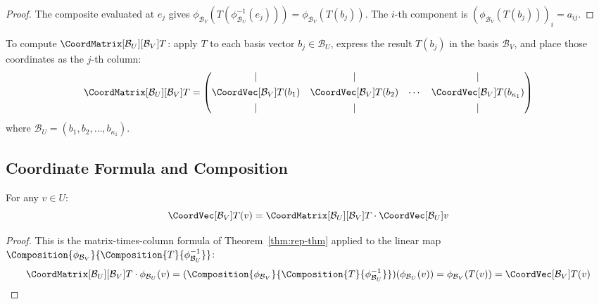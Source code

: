 \begin{proof}
    The composite evaluated at $e_j$ gives
    $\phi_{\mathcal{B}_V}(T(\phi_{\mathcal{B}_U}^{-1}(e_j)))
    = \phi_{\mathcal{B}_V}(T(b_j))$.
    The $i$-th component is
    $(\phi_{\mathcal{B}_V}(T(b_j)))_i = a_{ij}$.
\end{proof}

\begin{remark}
    To compute $\CoordMatrix[\mathcal{B}_U][\mathcal{B}_V]{T}$: apply $T$ to each basis vector
    $b_j \in \mathcal{B}_U$, express the result $T(b_j)$ in the basis $\mathcal{B}_V$,
    and place those coordinates as the $j$-th column:
    \[
        \CoordMatrix[\mathcal{B}_U][\mathcal{B}_V]{T}
        = \begin{pmatrix}
            \vert & \vert & & \vert \\[4pt]
            \CoordVec[\mathcal{B}_V]{T(b_1)} & \CoordVec[\mathcal{B}_V]{T(b_2)}
            & \cdots & \CoordVec[\mathcal{B}_V]{T(b_{\kappa_1})} \\[4pt]
            \vert & \vert & & \vert
        \end{pmatrix}
    \]
    where $\mathcal{B}_U = (b_1, b_2, \ldots, b_{\kappa_1})$.
\end{remark}

\subsection{Coordinate Formula and Composition}

\begin{corollary}
\label{prop:coord-formula}
    For any $v \in U$:
    \[
        \CoordVec[\mathcal{B}_V]{T(v)}
        = \CoordMatrix[\mathcal{B}_U][\mathcal{B}_V]{T}
          \cdot \CoordVec[\mathcal{B}_U]{v}
    \]
\end{corollary}

\begin{proof}
    This is the matrix-times-column formula of Theorem~\ref{thm:rep-thm} applied to the
    linear map
    $\Composition{\phi_{\mathcal{B}_V}}{\Composition{T}{\phi_{\mathcal{B}_U}^{-1}}}$:
    \[
        \CoordMatrix[\mathcal{B}_U][\mathcal{B}_V]{T} \cdot \phi_{\mathcal{B}_U}(v)
        = (\Composition{\phi_{\mathcal{B}_V}}{\Composition{T}{\phi_{\mathcal{B}_U}^{-1}}})
          (\phi_{\mathcal{B}_U}(v))
        = \phi_{\mathcal{B}_V}(T(v))
        = \CoordVec[\mathcal{B}_V]{T(v)} \qedhere
    \]
\end{proof}

